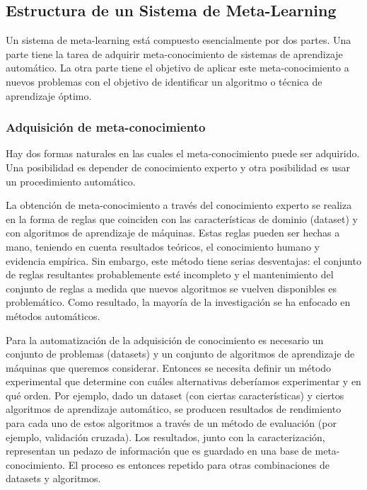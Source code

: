 \subsection{Estructura de un Sistema de Meta-Learning}

Un sistema de meta-learning está compuesto esencialmente por dos partes. Una parte tiene la tarea de adquirir meta-conocimiento de sistemas de aprendizaje automático. La otra parte tiene el objetivo de aplicar este meta-conocimiento a nuevos problemas con el objetivo de identificar un algoritmo o técnica de aprendizaje óptimo.

\subsubsection{Adquisición de meta-conocimiento} 

Hay dos formas naturales en las cuales el meta-conocimiento puede ser adquirido. Una posibilidad es depender de conocimiento experto y otra posibilidad es usar un procedimiento automático. 

La obtención de meta-conocimiento a través del conocimiento experto se realiza en la forma de reglas que coinciden con las características de dominio (dataset) y con algoritmos de aprendizaje de máquinas. Estas reglas pueden ser hechas a mano, teniendo en cuenta resultados teóricos, el conocimiento humano y evidencia empírica. Sin embargo, este método tiene serias desventajas: el conjunto de reglas resultantes probablemente esté incompleto y el mantenimiento del conjunto de reglas a medida que nuevos algoritmos se vuelven disponibles es problemático. Como resultado, la mayoría de la investigación se ha enfocado en métodos automáticos.
	
Para la automatización de la adquisición de conocimiento es necesario un conjunto de problemas (datasets) y un conjunto de algoritmos de aprendizaje de máquinas que queremos considerar. Entonces se necesita definir un método experimental que determine con cuáles alternativas deberíamos experimentar y en qué orden. Por ejemplo, dado un dataset (con ciertas características) y ciertos algoritmos de aprendizaje automático, se producen resultados de rendimiento para cada uno de estos algoritmos a través de un método de evaluación (por ejemplo, validación cruzada). Los resultados, junto con la caracterización, representan un pedazo de información que es guardado en una base de meta-conocimiento. El proceso es entonces repetido para otras combinaciones de datasets y algoritmos.

